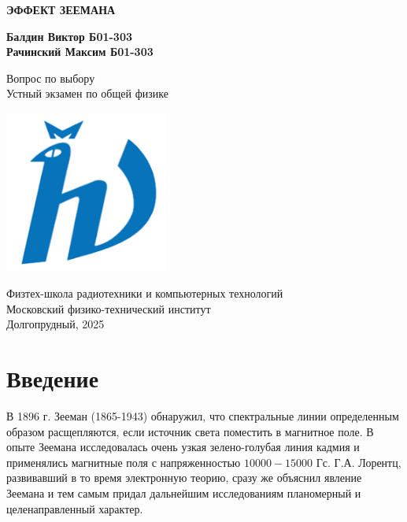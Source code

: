 \documentclass[12pt]{article}
\begin{document}
  \begin{titlepage}
      \begin{center}
          \vspace*{1cm}

          \Huge
          \textbf{ЭФФЕКТ ЗЕЕМАНА}

          \vspace{1.5cm}

          \Large
          \textbf{Балдин Виктор Б01-303\\
                  Рачинский Максим Б01-303}

          \vfill

          Вопрос по выбору \\
          Устный экзамен по общей физике

          \vspace{0.8cm}

          \includegraphics[width=0.4\textwidth]{university_logo.png}

          Физтех-школа радиотехники и компьютерных технологий\\
          Московский физико-технический институт\\
          Долгопрудный, 2025
      \end{center}
  \end{titlepage}

  \tableofcontents

  \section{Введение}
  В 1896 г. Зееман (1865-1943) обнаружил, что спектральные линии определенным образом расщепляются, если источник света поместить в магнитное поле. В опыте Зеемана исследовалась очень узкая зелено-голубая линия кадмия и применялись магнитные поля с напряженностью $10000-15000$ Гс. Г.А. Лорентц, развивавший в то время электронную теорию, сразу же объяснил явление Зеемана и тем самым придал дальнейшим исследованиям планомерный и целенаправленный характер.
\end{document}
